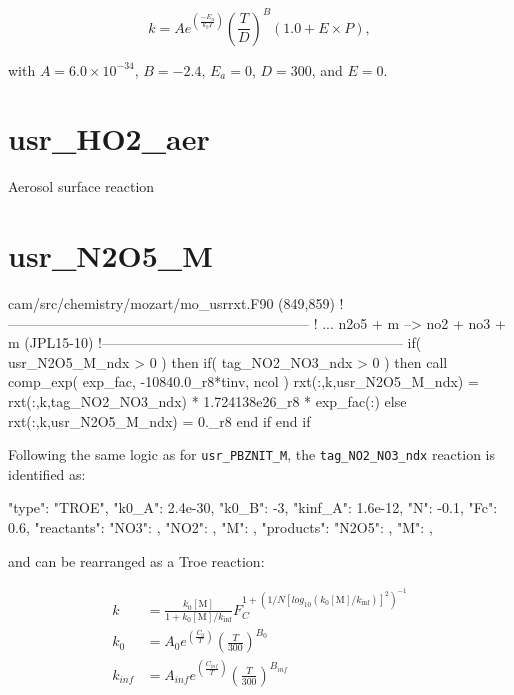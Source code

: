 \documentclass[titlepage]{article}
\begin{document}
\begin{equation}
k = Ae^{(\frac{-E_a}{k_bT})}(\frac{T}{D})^B(1.0+E \times P),
\end{equation}

\noindent with $A = 6.0 \times 10^{-34}$, $B = -2.4$, $E_a = 0$, $D = 300$, and $E = 0$.


\section{usr\_HO2\_aer}

Aerosol surface reaction


\section{usr\_N2O5\_M}

\begin{blockcode}[commandchars=\\\{\}]
\color{gray}cam/src/chemistry/mozart/mo_usrrxt.F90 (849,859)
!-----------------------------------------------------------------
! ... n2o5 + m --> no2 + no3 + m (JPL15-10)
!-----------------------------------------------------------------
       if( usr_N2O5_M_ndx > 0 ) then
          if( tag_NO2_NO3_ndx > 0 ) then
             call comp_exp( exp_fac, -10840.0_r8*tinv, ncol )
             rxt(:,k,usr_N2O5_M_ndx) = rxt(:,k,tag_NO2_NO3_ndx) * 1.724138e26_r8 * exp_fac(:)
          else
             rxt(:,k,usr_N2O5_M_ndx) = 0._r8
          end if
       end if
\end{blockcode}

Following the same logic as for \verb>usr_PBZNIT_M>, the \verb>tag_NO2_NO3_ndx> reaction is identified as:

\begin{blockcode}
        {
          "type": "TROE",
          "k0_A": 2.4e-30,
          "k0_B": -3,
          "kinf_A": 1.6e-12,
          "N": -0.1,
          "Fc": 0.6,
          "reactants": {
            "NO3": { },
            "NO2": { },
            "M": { }
          },
          "products": {
            "N2O5": { },
            "M": { }
          }
        },
\end{blockcode}

\noindent and can be rearranged as a Troe reaction:

\begin{equation}
\begin{split}
k & = \frac{k_0[\mbox{M}]}{1+k_0[\mbox{M}]/k_{\inf}}F_C^{1+(1/N[log_{10}(k_0[\mbox{M}]/k_{\inf})]^2)^{-1}} \\
k_0 & = A_0 e^{\left( \frac{C_0}{T} \right)} \left( \frac{T}{300} \right)^{B_0} \\
k_{inf} & = A_{inf} e^{\left( \frac{C_{inf}}{T} \right)} \left( \frac{T}{300} \right)^{B_{inf}}
\end{split}
\end{equation}
\end{document}

